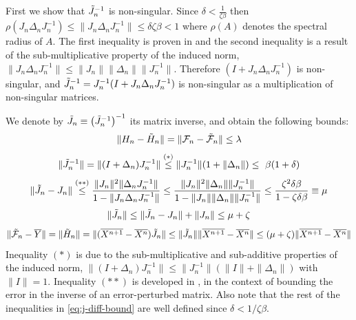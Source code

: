 \documentclass[nohyperref]{article}
\begin{document}
First we show that $\Tilde{J}_n^{-1}$ is non-singular. Since $\delta < \frac{1}{\zeta\beta}$ then $\rho(J_n \Delta_n J_n^{-1}) \leq \| J_n \Delta_n J_n^{-1} \| \leq \delta \zeta \beta < 1$ where $\rho(A)$ denotes the spectral radius of $A$. The first inequality is proven in \citet[Thm. 5.6.9]{matrixanalysisbook} and the second inequality is a result of the sub-multiplicative property of the induced norm, $\|J_n \Delta_n J_n^{-1}\| \leq \|J_n\| \|\Delta_n\| \|J_n^{-1}\|$. Therefore $(I+J_n \Delta_n J_n^{-1})$ is non-singular, and $\Tilde{J}_n^{-1}=J_n^{-1}(I + J_n \Delta_n J_n^{-1})$ is non-singular as a multiplication of non-singular matrices. 

We denote by $\Tilde{J}_n\equiv\left(\Tilde{J}_n^{-1}\right)^{-1}$ its matrix inverse, and obtain the following bounds:
\begin{equation}\label{eq:h-bound}
 \| H_n - \Tilde{H}_n \| = \| \mathcal{F}_n - \Tilde{\mathcal{F}}_n \| \leq \lambda
\end{equation}
\begin{equation}\label{eq:j-1-approx-bound}
    \| \Tilde{J}^{-1}_n \| = \| (I + \Delta_n) J_n^{-1}  \| \overset{(*)}{\leq} \| J^{-1}_n \| (1 + \| \Delta_n \|) \leq \ \beta(1+\delta)
\end{equation}
\begin{equation}\label{eq:j-diff-bound}
    \| \Tilde{J}_n - J_n \| \overset{(**)}{\leq} \frac{\|J_n\|^2 \| \Delta_n J_n^{-1}\|}{1-\|J_n \Delta_n J_n^{-1} \|}
    \leq  \frac{\|J_n\|^2 \| \Delta_n \| \| J_n^{-1}\|}{1-\|J_n \| \| \Delta_n \| \| J_n^{-1} \|} \leq \frac{\zeta^2 \delta \beta}{1-\zeta \delta \beta} \equiv \mu
\end{equation}
\begin{equation}
    \| \Tilde{J}_n \| \leq \| \Tilde{J}_n - J_n \| + \| J_n \| \leq \mu + \zeta
\end{equation}
\begin{equation}\label{eq:x-diff-bound}
    \| \Tilde{\mathcal{F}}_n - \overline{Y} \| = \| \Tilde{H}_n \| = \| (\overline{X^{n+1}} - \overline{X^n})\Tilde{J}_n  \| \leq \| \Tilde{J}_n \| \| \overline{X^{n+1}} - \overline{X^n}\|  \leq (\mu + \zeta)\| \overline{X^{n+1}} - \overline{X^n}\|
\end{equation}
Inequality $(*)$ is due to the sub-multiplicative and sub-additive properties of the induced norm, $\| (I + \Delta_n) J_n^{-1}  \| \leq \|J_n^{-1}\| (\|I\| + \|\Delta_n\|)$ with $\|I\|=1$. Inequality $(**)$ is developed in \citet[p.~381]{matrixanalysisbook}, in the context of bounding the error in the inverse of an error-perturbed matrix. Also note that the rest of the inequalities in \eqref{eq:j-diff-bound} are well defined since $\delta<1/\zeta\beta$.
\end{document}
